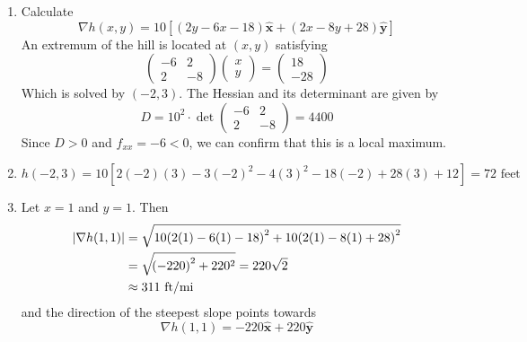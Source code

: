 \documentclass[a4paper]{article}
\begin{document}

\begin{enumerate}[label=(\alph*)]
	\item Calculate
	\[
		\nabla h \!\left( x,y \right) = 10 \!\left[ \!\left( 2y - 6x - 18 \right)\pmb{\hat{x}} + \!\left( 2x - 8y + 28 \right)\pmb{\hat{y}} \right]
	\]
	An extremum of the hill is located at \( \!\left( x,y \right) \) satisfying
	\[
		\begin{pmatrix}
			-6 & 2 \\
			2 & -8
		\end{pmatrix}
		\begin{pmatrix}
			x \\
			y
		\end{pmatrix}
		=
		\begin{pmatrix}
			18 \\
			-28
		\end{pmatrix}
	\]
	Which is solved by \( \!\left( -2,3 \right) \). The Hessian and its determinant are given by
	\[
		D = 10^{2} \cdot \det \begin{pmatrix}
			-6 & 2 \\
			2 & -8
		\end{pmatrix} = 4400
	\]
	Since \( D > 0 \) and \( f_{xx} = -6 < 0 \), we can confirm that this is a local maximum.
	\item \[
		h \!\left( -2,3 \right) = 10 \!\left[ 2 \!\left( -2 \right)\!\left( 3 \right) - 3 \!\left( -2 \right)^{2} - 4 \!\left( 3 \right)^{2} - 18 \!\left( -2 \right) + 28 \!\left( 3 \right) + 12 \right] = 72 \text{ feet}
	\]
	\item Let \( x = 1 \) and \( y = 1 \). Then
	\begin{align*}
		\abs{\nabla h \!\left( 1,1 \right)} & = \sqrt{10 \!\left( 2 \!\left( 1 \right) - 6 \!\left( 1 \right) - 18 \right)^{2} + 10\!\left( 2 \!\left( 1 \right) - 8 \!\left( 1 \right) + 28 \right)^{2}} \\
						    & = \sqrt{\!\left( -220 \right)^{2} + 220^{2}} = 220 \sqrt{2} \\
						    & \approx 311 \text{ ft/mi}
	\end{align*}
	and the direction of the steepest slope points towards
	\[
		\nabla h \!\left( 1,1 \right) = -220 \pmb{\hat{x}} + 220 \pmb{\hat{y}} 
	\]
\end{enumerate}
\end{document}
